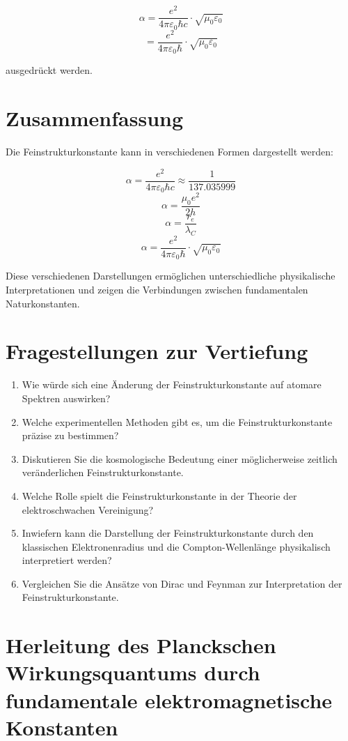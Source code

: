\documentclass{article}
\begin{document}
	$$\alpha = \frac{e^2}{4\pi\varepsilon_0\hbar c} \cdot \sqrt{\mu_0\varepsilon_0}$$
	$$= \frac{e^2}{4\pi\varepsilon_0\hbar} \cdot \sqrt{\mu_0\varepsilon_0}$$
	
	ausgedrückt werden.
	
	\section{Zusammenfassung}
	Die Feinstrukturkonstante kann in verschiedenen Formen dargestellt werden:
	
	$$\alpha = \frac{e^2}{4\pi\varepsilon_0\hbar c} \approx \frac{1}{137.035999}$$
	$$\alpha = \frac{\mu_0e^2}{2h}$$
	$$\alpha = \frac{r_e}{\lambda_C}$$
	$$\alpha = \frac{e^2}{4\pi\varepsilon_0\hbar} \cdot \sqrt{\mu_0\varepsilon_0}$$
	
	Diese verschiedenen Darstellungen ermöglichen unterschiedliche physikalische Interpretationen und zeigen die Verbindungen zwischen fundamentalen Naturkonstanten.
	
	\section{Fragestellungen zur Vertiefung}
	
	\begin{enumerate}
		\item Wie würde sich eine Änderung der Feinstrukturkonstante auf atomare Spektren auswirken?
		\item Welche experimentellen Methoden gibt es, um die Feinstrukturkonstante präzise zu bestimmen?
		\item Diskutieren Sie die kosmologische Bedeutung einer möglicherweise zeitlich veränderlichen Feinstrukturkonstante.
		\item Welche Rolle spielt die Feinstrukturkonstante in der Theorie der elektroschwachen Vereinigung?
		\item Inwiefern kann die Darstellung der Feinstrukturkonstante durch den klassischen Elektronenradius und die Compton-Wellenlänge physikalisch interpretiert werden?
		\item Vergleichen Sie die Ansätze von Dirac und Feynman zur Interpretation der Feinstrukturkonstante.
	\end{enumerate}
	
	\section{Herleitung des Planckschen Wirkungsquantums durch fundamentale elektromagnetische Konstanten}
	
\end{document}
